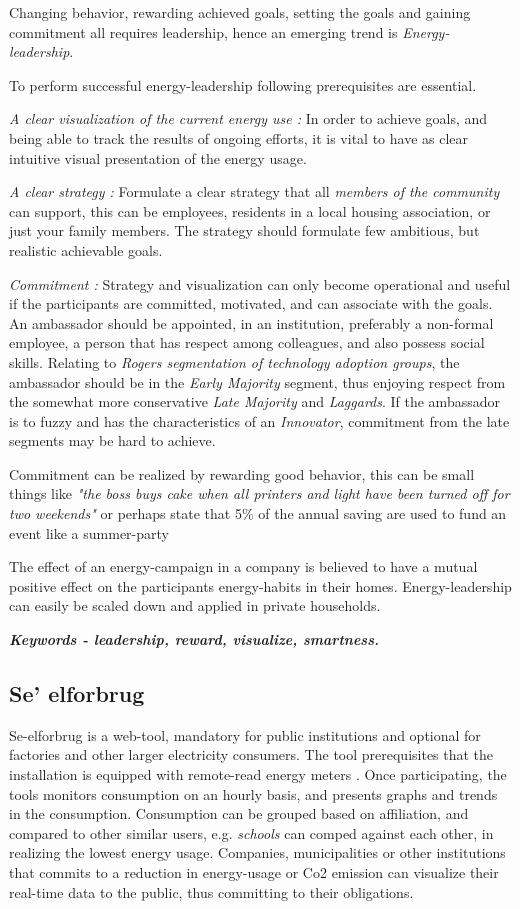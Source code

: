 \documentclass[journal]{IEEEtran}
\begin{document}
Changing behavior, rewarding achieved goals, setting the goals and gaining commitment all requires leadership, hence an emerging trend is \textit{Energy-leadership}. 

To perform successful energy-leadership following prerequisites are essential.

\textit{A clear visualization of the current energy use :} In order to achieve goals, and being able to track the results of ongoing efforts, it is vital to have as clear intuitive visual presentation of the energy usage.
 
\textit{A clear strategy :} Formulate a clear strategy that all \textit{members of the community} can support, this can be employees, residents in a local housing association, or just your family members. The strategy should formulate few ambitious, but realistic achievable goals. 

\textit{Commitment :} Strategy and visualization can only become operational and useful if the participants are committed, motivated, and can associate with the goals. An ambassador should be appointed, in an institution, preferably a non-formal employee, a person that has respect among colleagues, and also possess social skills. Relating to \textit{Rogers segmentation of technology adoption groups}, the ambassador should be in the \textit{Early Majority} segment, thus enjoying respect from the somewhat more conservative \textit{Late Majority} and \textit{Laggards}. If the ambassador is to fuzzy and has the characteristics of an \textit{Innovator}, commitment from the late segments may be hard to achieve. 

Commitment can be realized by rewarding good behavior, this can be small things like \textit{"the boss buys cake when all printers and light have been turned off for two weekends"} or perhaps state that 5\% of the annual saving are used to fund an event like a summer-party 

The effect of an energy-campaign in a company is believed to have a mutual positive effect on the participants energy-habits in their homes\cite{hidden_e}. Energy-leadership can easily be scaled down and applied in private households. \newline

\textbf{\textit{Keywords - leadership, reward, visualize, smartness.}}


\subsection{Se' elforbrug}
Se-elforbrug is a web-tool, mandatory for public institutions and optional for factories and other larger electricity consumers. The tool prerequisites that the installation is equipped with remote-read energy meters \cite{see}. 
Once participating, the tools monitors consumption on an hourly basis, and presents graphs and trends in the consumption. Consumption can be grouped based on affiliation, and compared to other similar users, e.g. \textit{schools} can comped against each other, in realizing the lowest energy usage.
Companies, municipalities or other institutions that commits to a reduction in energy-usage or Co2 emission can visualize their real-time data to the public, thus committing to their obligations.
\end{document}
